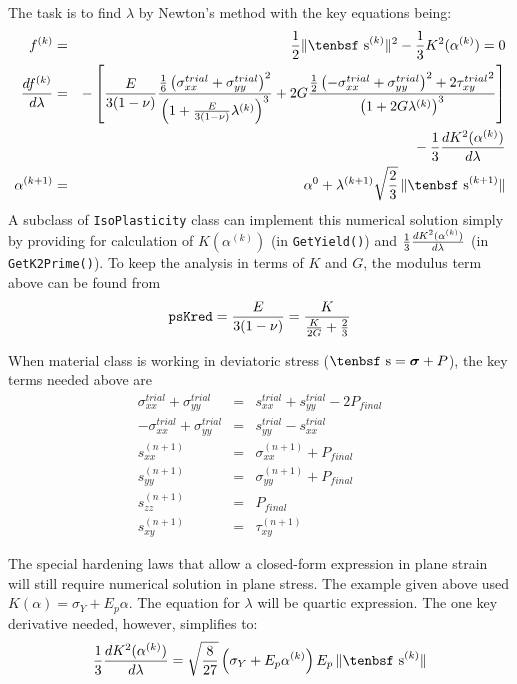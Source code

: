 \documentclass[11pt]{article}
\renewcommand{\vec}[1]{\boldsymbol{#1}}
\def\dev{\hbox{\tenbsf s}}
\def\code#1{{\small\tt #1}}
\def\s#1{\sigma_{#1}}
\begin{document}
The task is to find $\lambda$ by Newton's method with the key equations being:
\begin{eqnarray}
        f^{(k)} & = & {1\over 2}\|\dev^{(k)}\|^2 -  {1\over 3} K^2(\alpha^{(k)}) = 0 \\
        {df^{(k)}\over d\lambda} & = & -\left[{ E\over 3(1-\nu)}{{1\over 6}\left( \s{xx}^{trial} +  \s{yy}^{trial} \right)^2 \over
                                                     \left( 1 + { E\over 3(1-\nu)}\lambda^{(k)}\right)^3}
             + 2G{{1\over 2}\left( -\s{xx}^{trial} +  \s{yy}^{trial} \right)^2 + 2{\tau_{xy}^{trial}}^2 \over \left(1 + 2 G\lambda^{(k)}\right)^3}\right]  
 \nonumber \\
 &&\qquad\mbox{}
                                       - {1\over 3}{dK^2(\alpha^{(k)})\over d\lambda}  \\
        \alpha^{(k+1)} & = & \alpha^{0} +  \lambda^{(k+1)} \sqrt{2\over3}\thinspace \|\dev^{(k+1)}\|
\end{eqnarray}
A subclass of \code{IsoPlasticity} class can implement this numerical solution simply by providing for calculation of $K(\alpha^{(k)})$ (in \code{GetYield()}) and ${1\over3}{dK^2(\alpha^{(k)})\over d\lambda}$ (in \code{GetK2Prime()}). To keep the analysis in terms of $K$ and $G$, the modulus term above can be found from
\begin{equation}
       \code{psKred} = { E\over 3(1-\nu)} = {K \over {K\over 2G} + {2\over 3}} 
\end{equation}

When material class is working in deviatoric stress ($\dev = \vec\sigma+P$), the key terms needed above are
\begin{eqnarray}
       \s{xx}^{trial} +  \s{yy}^{trial} & = & s_{xx}^{trial} + s_{yy}^{trial} - 2P_{final} \\
       -\s{xx}^{trial} +  \s{yy}^{trial}  & = & s_{yy}^{trial} - s_{xx}^{trial} \\
       s_{xx}^{(n+1)} & = & \s{xx}^{(n+1)} + P_{final} \\
       s_{yy}^{(n+1)} & = & \s{yy}^{(n+1)} + P_{final} \\
       s_{zz}^{(n+1)} & = & P_{final} \\
       s_{xy}^{(n+1)} & = &  \tau_{xy}^{(n+1)} 
\end{eqnarray}

The special hardening laws that allow a closed-form expression in plane strain will still require numerical solution in plane stress. The example given above used $K(\alpha)=\sigma_Y + E_p\alpha$. The equation for $\lambda$ will be quartic expression. The one key derivative needed, however, simplifies to:
\begin{equation}
      {1\over3}{dK^2(\alpha^{(k)})\over d\lambda} = \sqrt{8\over27}
           \left(\sigma_Y + E_p\alpha^{(k)}\right)E_p\thinspace \|\dev^{(k)}\|
\end{equation}
\end{document}
